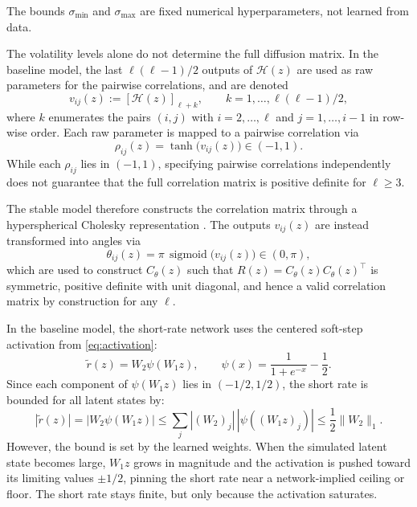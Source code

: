 \begin{description}[
    style=unboxed,
    leftmargin=0pt,
    labelindent=0pt,
    labelsep=0.5em
]
The bounds $\sigma_{\min}$ and $\sigma_{\max}$ are fixed numerical hyperparameters, not learned from data.


\item[Correlation structure.] The volatility levels alone do not determine the full diffusion matrix. In the baseline model, the last $\ell(\ell-1)/2$ outputs of $\mathcal{H}(z)$ are used as raw parameters for the pairwise correlations, and are denoted
\[
v_{ij}(z) := [\mathcal{H}(z)]_{\ell+k}, \qquad k = 1,\ldots,\ell(\ell-1)/2,
\]
where $k$ enumerates the pairs $(i,j)$ with $i=2,\ldots,\ell$ and $j=1,\ldots,i-1$ in row-wise order. Each raw parameter is mapped to a pairwise correlation via
\[
\rho_{ij}(z) = \tanh \bigl(v_{ij}(z)\bigr) \in (-1,1).
\]
While each $\rho_{ij}$ lies in $(-1,1)$, specifying pairwise correlations  independently does not guarantee that the full correlation matrix is  positive definite for $\ell \geq 3$.

The stable model therefore constructs the correlation matrix through a 
hyperspherical Cholesky representation \citep{PourahmadiWang2015}. The outputs $v_{ij}(z)$ are instead transformed into angles via
\[
\theta_{ij}(z) = \pi\,\operatorname{sigmoid} \bigl(v_{ij}(z)\bigr) \in (0,\pi),
\]
which are used to construct $C_\theta(z)$ such that $R(z) = C_\theta(z)C_\theta(z)^\top$ is symmetric, positive definite with unit diagonal, and hence a valid correlation matrix by construction for any $\ell$.

\item[Short-rate behaviour.] In the baseline model, the short-rate network uses the centered soft-step activation from \eqref{eq:activation}:
\[
\tilde r(z)
=
W_2\psi(W_1z),
\qquad
\psi(x)=\frac{1}{1+e^{-x}}-\frac12.
\]
Since each component of \(\psi(W_1z)\) lies in \((-1/2,1/2)\), the short rate is bounded for all latent states by:
\[
|\tilde r(z)|
=
|W_2\psi(W_1z)|
\leq
\sum_j |(W_2)_j|\,|\psi((W_1z)_j)|
\leq
\frac12\|W_2\|_1.
\]
However, the bound is set by the learned weights. When the simulated latent state becomes large, \(W_1z\) grows in magnitude and the activation is pushed toward its limiting values \(\pm 1/2\), pinning the short rate near a network-implied ceiling or floor. The short rate stays finite, but only because the activation saturates.


\end{description}

